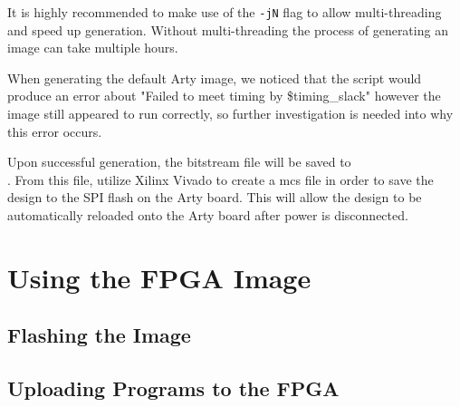 	It is highly recommended to make use of the \texttt{-jN} flag to allow multi-threading and speed up generation. Without multi-threading the process of generating an image can take multiple hours.
	
	When generating the default Arty image, we noticed that the script would produce an error about "Failed to meet timing by \$timing\_slack" however the image still appeared to run correctly, so further investigation is needed into why this error occurs.
	
	Upon successful generation, the bitstream file will be saved to \\ . From this file, utilize Xilinx Vivado to create a \gls{mcs} file in order to save the design to the SPI flash on the Arty board. This will allow the design to be automatically reloaded onto the Arty board after power is disconnected.

\section{Using the FPGA Image}\label{sec:Using_FPGA_Image}
\subsection{Flashing the Image}\label{sec:Flash_FPGA_Image}
\subsection{Uploading Programs to the FPGA}\label{sec:Upload_Programs_to_Flashed_FPGA}

